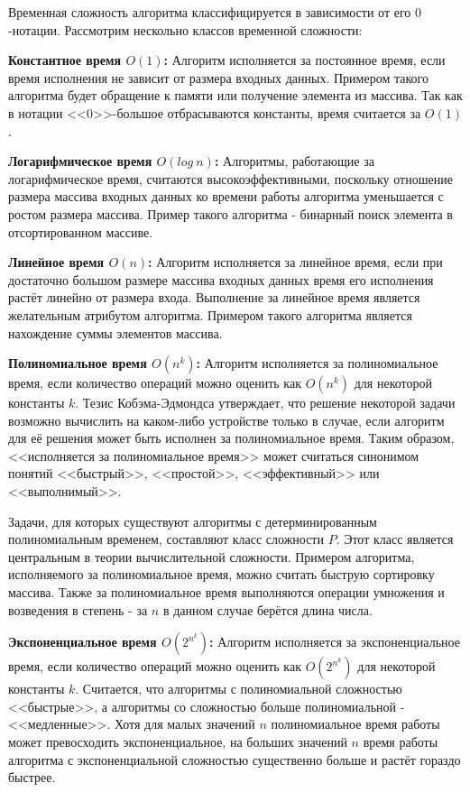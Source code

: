 \documentclass[times,specification,annotation]{itmo-student-thesis}
\begin{document}
Временная сложность алгоритма классифицируется в зависимости от его $\textit{0}$-нотации.
Рассмотрим нескольно классов временной сложности:

\textbf{Константное время $O(1)$:}
Алгоритм исполняется за постоянное время,
если время исполнения не зависит от размера входных данных.
Примером такого алгоритма будет обращение к памяти или получение элемента из массива.
Так как в нотации <<$\textit{0}$>>-большое отбрасываются константы, время считается за $O(1)$.

\textbf{Логарифмическое время $O(log~n)$:}
Алгоритмы, работающие за логарифмическое время, считаются высокоэффективными, поскольку
отношение размера массива входных данных ко времени работы алгоритма уменьшается с ростом размера массива.
Пример такого алгоритма - бинарный поиск элемента в отсортированном массиве.

\textbf{Линейное время $O(n)$:}
Алгоритм исполняется за линейное время, если при достаточно большом размере массива входных данных
время его исполнения растёт линейно от размера входа.
Выполнение за линейное время является желательным атрибутом алгоритма.
Примером такого алгоритма является нахождение суммы элементов массива.

\textbf{Полиномиальное время $O(n^k)$:}
Алгоритм исполняется за полиномиальное время, если количество операций можно оценить как $O(n^k)$ для некоторой константы $k$.
Тезис Кобэма-Эдмондса утверждает, что решение некоторой задачи возможно вычислить на каком-либо устройстве только в случае,
если алгоритм для её решения может быть исполнен за полиномиальное время.
Таким образом, <<исполняется за полиномиальное время>> может считаться синонимом понятий <<быстрый>>, <<простой>>, <<эффективный>>
или <<выполнимый>>.

Задачи, для которых существуют алгоритмы с детерминированным полиномиальным временем, составляют класс сложности $P$.
Этот класс является центральным в теории вычислительной сложности.
Примером алгоритма, исполняемого за полиномиальное время, можно считать быструю сортировку массива.
Также за полиномиальное время выполняются операции умножения и возведения в степень - за $n$ в данном случае
берётся длина числа.

\textbf{Экспоненциальное время $O(2^{n^k})$:}
Алгоритм исполняется за экспоненциальное время, если количество операций можно оценить как $O(2^{n^k})$ для некоторой константы $k$.
Считается, что алгоритмы с полиномиальной сложностью <<быстрые>>, а алгоритмы со сложностью больше полиномиальной - <<медленные>>.
Хотя для малых значений $n$ полиномиальное время работы может превосходить экспоненциальное, на больших
значений $n$ время работы алгоритма с экспоненциальной сложностью существенно больше и растёт гораздо
быстрее.
\end{document}
